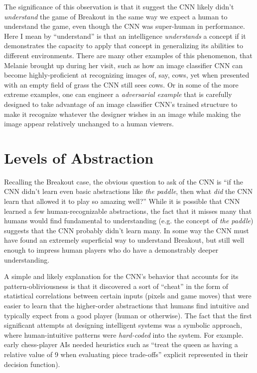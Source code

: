 \documentclass{article}
\renewcommand{\it}{\textit}
\begin{document}
The significance of this observation is that it suggest the CNN likely didn't \it{understand} the game of Breakout in the same way we expect a human to understand the game, even though the CNN was super-human in performance.
Here I mean by ``understand'' is that an intelligence \it{understands} a concept if it demonstrates the capacity to apply that concept in generalizing its abilities to different environments.
There are many other examples of this phenomenon, that Melanie brought up during her visit, such as how an image classifier CNN can become highly-proficient at recognizing images of, say, cows, yet when presented with an empty field of grass the CNN still sees cows. Or in some of the more extreme examples, one can engineer a \it{adversarial example} that is carefully designed to take advantage of an image classifier CNN's trained structure to make it recognize whatever the designer wishes in an image while making the image appear relatively unchanged to a human viewers.

\section{Levels of Abstraction}

Recalling the Breakout case, the obvious question to ask of the CNN is ``if the CNN didn't learn even basic abstractions like \it{the paddle}, then what \it{did} the CNN learn that allowed it to play so amazing well?'' While it is possible that CNN learned a few human-recognizable abstractions, the fact that it misses many that humans would find fundamental to understanding (e.g. the concept of \it{the paddle}) suggests that the CNN probably didn't learn many.
In some way the CNN must have found an extremely superficial way to understand Breakout, but still well enough to impress human players who do have a demonstrably deeper understanding.

A simple and likely explanation for the CNN's behavior that accounts for its pattern-obliviousness is that it discovered a sort of ``cheat'' in the form of statistical correlations between certain inputs (pixels and game moves) that were easier to learn that the higher-order abstractions that humans find intuitive and typically expect from a good player (human or otherwise).
The fact that the first significant attempts at designing intelligent systems was a symbolic approach, where human-intuitive patterns were \it{hard-coded} into the system. For example. early chess-player AIs needed heuristics such as ``treat the queen as having a relative value of 9 when evaluating piece trade-offs'' explicit represented in their decision function).
\end{document}
